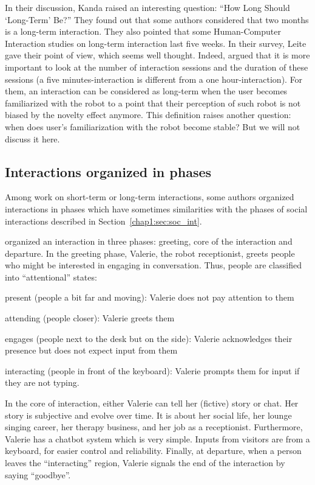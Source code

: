 \documentclass[a4paper,11pt,twoside]{StyleThese}
\begin{document}
In their discussion, Kanda \etal{} raised an interesting question: ``How Long Should \textquoteleft Long-Term\textquoteright{} Be?'' They found out that some authors considered that two months is a long-term interaction. They also pointed that some Human-Computer Interaction studies on long-term interaction last five weeks. In their survey, Leite \etal{} gave their point of view, which seems well thought. Indeed, argued that it is more important to look at the number of interaction sessions and the duration of these sessions (a five minutes-interaction is different from a one hour-interaction). For them, an interaction can be considered as long-term when the user becomes familiarized with the robot to a point that their perception of such robot is not biased by the novelty effect anymore. This definition raises another question: when does user’s familiarization with the robot become stable? But we will not discuss it here.

\subsection{Interactions organized in phases}\label{chap2:subsec:inter_div}
Among work on short-term or long-term interactions, some authors organized interactions in phases which have sometimes similarities with the phases of social interactions described in Section~\ref{chap1:sec:soc_int}.

\cite{gockley_2005_designing} organized an interaction in three phases: greeting, core of the interaction and departure. In the greeting phase, Valerie, the robot receptionist, greets people who might be interested in engaging in conversation. Thus, people are classified into ``attentional'' states:
\begin{bulletList}
	\item present (people a bit far and moving): Valerie does not pay attention to them
	\item attending (people closer): Valerie greets them
	\item engages (people next to the desk but on the side): Valerie acknowledges their presence but does not expect input from them
	\item interacting (people in front of the keyboard): Valerie prompts them for input if they are not typing.
\end{bulletList}
In the core of interaction, either Valerie can tell her (fictive) story or chat. Her story is subjective and evolve over time. It is about her social life, her lounge singing career, her therapy business, and her job as a receptionist. Furthermore, Valerie has a chatbot system which is very simple. Inputs from visitors are from a keyboard, for easier control and reliability. Finally, at departure, when a person leaves the ``interacting'' region, Valerie signals the end of the interaction by saying ``goodbye''. 
\end{document}
